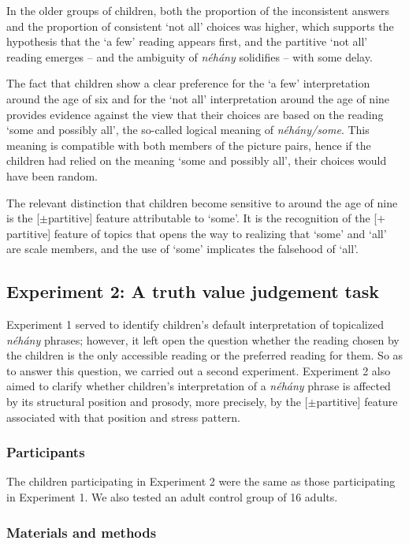 \documentclass[output=paper]{langscibook}
\begin{document}
In the older groups of children, both the proportion of the inconsistent answers and the proportion of consistent `not all' choices was higher, which supports the hypothesis that the `a few' reading appears first, and the partitive `not all' reading emerges – and the ambiguity of \textit{néhány} solidifies – with some delay. 

The fact that children show a clear preference for the `a few' interpretation around the age of six and for the `not all' interpretation around the age of nine provides evidence against the view that their choices are based on the reading `some and possibly all', the so-called logical meaning of \textit{néhány/some}. This meaning is compatible with both members of the picture pairs, hence if the children had relied on the meaning `some and possibly all', their choices would have been random. 

The relevant distinction that children become sensitive to around the age of nine is the [$\pm$partitive] feature attributable to `some'. It is the recognition of the [$+$partitive] feature of topics that opens the way to realizing that `some' and `all' are scale members, and the use of `some' implicates the falsehood of `all'.

\subsection{Experiment 2: A truth value judgement task}

Experiment 1 served to identify children's default interpretation of topicalized \textit{néhány} phrases; however, it left open the question whether the reading chosen by the children is the only accessible reading or the preferred reading for them. So as to answer this question, we carried out a second experiment. Experiment 2 also aimed to clarify whether children's interpretation of a \textit{néhány} phrase is affected by its structural position and prosody, more precisely, by the [$\pm$partitive] feature associated with that position and stress pattern. 

\subsubsection{Participants}

The children participating in Experiment 2 were the same as those participating in Experiment 1. We also tested an adult control group of 16 adults.

\subsubsection{Materials and methods}
\end{document}
